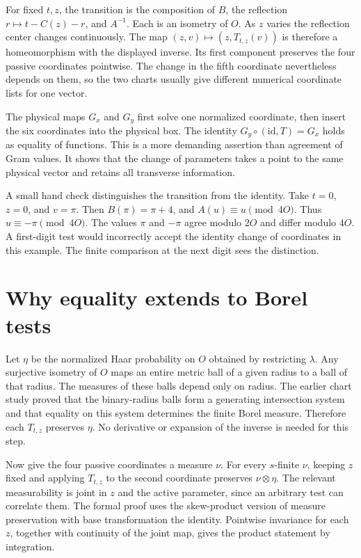 \documentclass[12pt,letterpaper]{article}
\begin{document}
For fixed $t,z$, the transition is the composition of $B$, the reflection $r\mapsto t-C(z)-r$, and $A^{-1}$. Each is an isometry of $O$. As $z$ varies the reflection center changes continuously. The map $(z,v)\mapsto(z,T_{t,z}(v))$ is therefore a homeomorphism with the displayed inverse. Its first component preserves the four passive coordinates pointwise. The change in the fifth coordinate nevertheless depends on them, so the two charts usually give different numerical coordinate lists for one vector.

The physical maps $G_x$ and $G_y$ first solve one normalized coordinate, then insert the six coordinates into the physical box. The identity $G_y\circ(\mathrm{id},T)=G_x$ holds as equality of functions. This is a more demanding assertion than agreement of Gram values. It shows that the change of parameters takes a point to the same physical vector and retains all transverse information.

A small hand check distinguishes the transition from the identity. Take $t=0$, $z=0$, and $v=\pi$. Then $B(\pi)=\pi+4$, and $A(u)\equiv u\pmod{4O}$. Thus $u\equiv-\pi\pmod{4O}$. The values $\pi$ and $-\pi$ agree modulo $2O$ and differ modulo $4O$. A first-digit test would incorrectly accept the identity change of coordinates in this example. The finite comparison at the next digit sees the distinction.

\section{Why equality extends to Borel tests}
Let $\eta$ be the normalized Haar probability on $O$ obtained by restricting $\lambda$. Any surjective isometry of $O$ maps an entire metric ball of a given radius to a ball of that radius. The measures of these balls depend only on radius. The earlier chart study proved that the binary-radius balls form a generating intersection system and that equality on this system determines the finite Borel measure. Therefore each $T_{t,z}$ preserves $\eta$. No derivative or expansion of the inverse is needed for this step.

Now give the four passive coordinates a measure $\nu$. For every $s$-finite $\nu$, keeping $z$ fixed and applying $T_{t,z}$ to the second coordinate preserves $\nu\otimes\eta$. The relevant measurability is joint in $z$ and the active parameter, since an arbitrary test can correlate them. The formal proof uses the skew-product version of measure preservation with base transformation the identity. Pointwise invariance for each $z$, together with continuity of the joint map, gives the product statement by integration.
\end{document}
